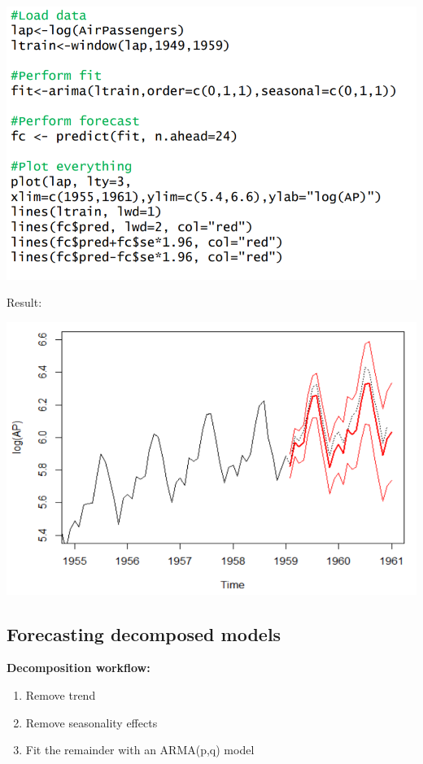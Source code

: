 \documentclass[
]{article}
\providecommand{\tightlist}{%
  \setlength{\itemsep}{0pt}\setlength{\parskip}{0pt}}
\begin{document}
\includegraphics[width=1\linewidth]{sarfit}

Result:

\includegraphics[width=1\linewidth]{res}

\hypertarget{forecasting-decomposed-models}{%
\subsection{Forecasting decomposed
models}\label{forecasting-decomposed-models}}

\textbf{Decomposition workflow:}

\begin{enumerate}
\def\labelenumi{\arabic{enumi}.}
\tightlist
\item
  Remove trend
\item
  Remove seasonality effects
\item
  Fit the remainder with an ARMA(p,q) model
\end{enumerate}
\end{document}
